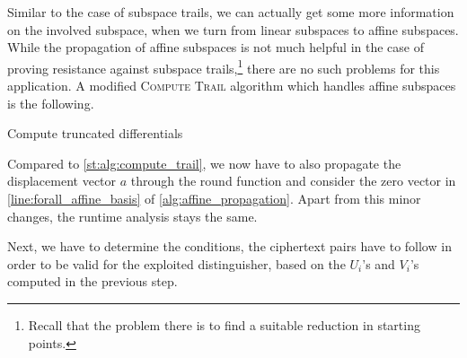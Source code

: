 Similar to the case of subspace trails, we can actually get some more information on the involved subspace, when we turn from linear subspaces to affine subspaces.
While the propagation of affine subspaces is not much helpful in the case of proving resistance against subspace trails,\footnote{%
    Recall that the problem there is to find a suitable reduction in starting points.
} there are no such problems for this application.
A modified \textsc{Compute Trail} algorithm which handles affine subspaces is the following.
\begin{algorithm}
    \caption{Compute truncated differentials}\label{alg:affine_propagation}
\begin{algorithmic}[1]
    \Statex{}
        \State{}
    \EndIf{}
    \label{line:forall_affine_basis}
        \EndFor{}
    \EndFor{}
    \State{}
    \EndFunction{}
\end{algorithmic}
\end{algorithm}

Compared to \cref{st:alg:compute_trail}, we now have to also propagate the displacement vector $a$ through the round function and consider the zero vector in \cref{line:forall_affine_basis} of \cref{alg:affine_propagation}.
Apart from this minor changes, the runtime analysis stays the same.

Next, we have to determine the conditions, the ciphertext pairs have to follow in order to be valid for the exploited distinguisher, based on the $U_i$'s and $V_i$'s computed in the previous step.

